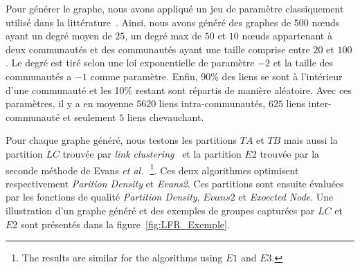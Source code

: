 Pour générer le graphe, nous avons appliqué un jeu de paramètre classiquement utilisé dans la littérature~\cite{Fortunato2010}.
Ainsi, nous avons généré des graphes de $500$ n\oe uds ayant un degré moyen de $25$, un degré max de $50$ et $10$ n\oe uds appartenant à deux communautés et des communautés ayant une taille comprise entre $20$ et $100$.
Le degré est tiré selon une loi exponentielle de paramètre $-2$ et la taille des communautés a $-1$ comme paramètre.
Enfin, 90\% des liens se sont à l'intérieur d'une communauté et les 10\% restant sont répartis de manière aléatoire.
Avec ces paramètres, il y a en moyenne $5620$ liens intra-communautés, $625$ liens inter-communauté et seulement $5$ liens chevauchant.

Pour chaque graphe généré, nous testons les partitions $TA$ et $TB$ mais aussi la partition $LC$ trouvée par \textit{link clustering}~\cite{Ahn2010a} et la partition $E2$ trouvée par la seconde méthode de Evans \textit{et al.}~\cite{Evans2009}\,\footnote{The results are similar for the algorithms using $E1$ and $E3$.}.
Ces deux algorithmes optimisent respectivement \emph{Parition Density} et \emph{Evans2}.
Ces partitions sont ensuite évaluées par les fonctions de qualité \emph{Partition Density}, $Evans2$ et \emph{Exoected Node}.
Une illustration d'un graphe généré et des exemples de groupes capturées par $LC$ et $E2$ sont présentés dans la figure~\ref{fig:LFR_Exemple}.

